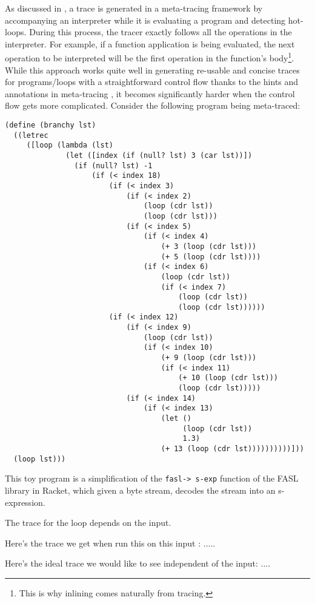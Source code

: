 As discussed in , a trace is generated in a
meta-tracing framework by accompanying an interpreter while it is
evaluating a program and detecting hot-loops. During this process, the
tracer exactly follows all the operations in the interpreter. For
example, if a function application is being evaluated, the next
operation to be interpreted will be the first operation in the
function's body\footnote{This is why inlining comes naturally from
  tracing.}. While this approach works quite well in generating
re-usable and concise traces for programs/loops with a straightforward
control flow thanks to the hints and annotations in meta-tracing
\cite{bolz09}, it becomes significantly harder when the control flow
gets more complicated. Consider the following program being
meta-traced:

{\small
\begin{lstlisting}[mathescape]
(define (branchy lst)
  ((letrec
     ([loop (lambda (lst)
              (let ([index (if (null? lst) 3 (car lst))])
                (if (null? lst) -1
                    (if (< index 18)
                        (if (< index 3)
                            (if (< index 2)
                                (loop (cdr lst))
                                (loop (cdr lst)))
                            (if (< index 5)
                                (if (< index 4)
                                    (+ 3 (loop (cdr lst)))
                                    (+ 5 (loop (cdr lst))))
                                (if (< index 6)
                                    (loop (cdr lst))
                                    (if (< index 7)
                                        (loop (cdr lst))
                                        (loop (cdr lst))))))
                        (if (< index 12)
                            (if (< index 9)
                                (loop (cdr lst))
                                (if (< index 10)
                                    (+ 9 (loop (cdr lst)))
                                    (if (< index 11)
                                        (+ 10 (loop (cdr lst)))
                                        (loop (cdr lst)))))
                            (if (< index 14)
                                (if (< index 13)
                                    (let ()
                                         (loop (cdr lst))
                                         1.3)
                                    (+ 13 (loop (cdr lst))))))))))]))
  (loop lst)))
\end{lstlisting}}

This toy program is a simplification of the \texttt{fasl-\textgreater
  s-exp} function of the FASL library in Racket, which given a byte
stream, decodes the stream into an s-expression.

The trace for the loop depends on the input.

Here's the trace we get when run this on this input : .....

Here's the ideal trace we would like to see independent of the input: ....
